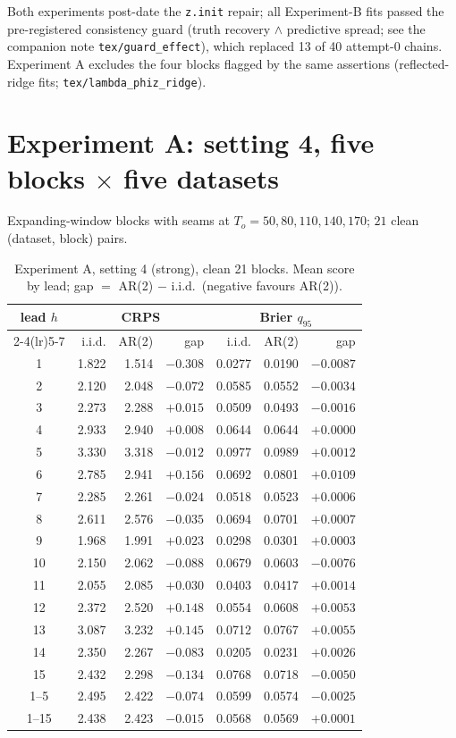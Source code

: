 \documentclass[11pt]{article}
\newcommand{\code}[1]{\texttt{#1}}
\begin{document}
Both experiments post-date the \code{z.init} repair; all
Experiment-B fits passed the pre-registered consistency guard (truth
recovery $\wedge$ predictive spread; see the companion note
\code{tex/guard\_effect}), which replaced 13 of 40 attempt-0 chains.
Experiment A excludes the four blocks flagged by the same assertions
(reflected-ridge fits; \code{tex/lambda\_phiz\_ridge}).

\section{Experiment A: setting 4, five blocks $\times$ five datasets}

Expanding-window blocks with seams at $T_o = 50, 80, 110, 140, 170$;
$21$ clean (dataset, block) pairs.

\begin{table}[ht]
\centering
\caption{Experiment A, setting 4 (strong), clean 21 blocks. Mean score by
lead; gap $=$ AR(2) $-$ i.i.d.\ (negative favours AR(2)).}
\label{tab:expA}
\small
\begin{tabular}{crrrrrr}
\toprule
lead $h$ & \multicolumn{3}{c}{CRPS} & \multicolumn{3}{c}{Brier $q_{95}$} \\
\cmidrule(lr){2-4}\cmidrule(lr){5-7}
 & i.i.d. & AR(2) & gap & i.i.d. & AR(2) & gap \\
\midrule
1 & 1.822 & 1.514 & $-0.308$ & 0.0277 & 0.0190 & $-0.0087$ \\
2 & 2.120 & 2.048 & $-0.072$ & 0.0585 & 0.0552 & $-0.0034$ \\
3 & 2.273 & 2.288 & $+0.015$ & 0.0509 & 0.0493 & $-0.0016$ \\
4 & 2.933 & 2.940 & $+0.008$ & 0.0644 & 0.0644 & $+0.0000$ \\
5 & 3.330 & 3.318 & $-0.012$ & 0.0977 & 0.0989 & $+0.0012$ \\
6 & 2.785 & 2.941 & $+0.156$ & 0.0692 & 0.0801 & $+0.0109$ \\
7 & 2.285 & 2.261 & $-0.024$ & 0.0518 & 0.0523 & $+0.0006$ \\
8 & 2.611 & 2.576 & $-0.035$ & 0.0694 & 0.0701 & $+0.0007$ \\
9 & 1.968 & 1.991 & $+0.023$ & 0.0298 & 0.0301 & $+0.0003$ \\
10 & 2.150 & 2.062 & $-0.088$ & 0.0679 & 0.0603 & $-0.0076$ \\
11 & 2.055 & 2.085 & $+0.030$ & 0.0403 & 0.0417 & $+0.0014$ \\
12 & 2.372 & 2.520 & $+0.148$ & 0.0554 & 0.0608 & $+0.0053$ \\
13 & 3.087 & 3.232 & $+0.145$ & 0.0712 & 0.0767 & $+0.0055$ \\
14 & 2.350 & 2.267 & $-0.083$ & 0.0205 & 0.0231 & $+0.0026$ \\
15 & 2.432 & 2.298 & $-0.134$ & 0.0768 & 0.0718 & $-0.0050$ \\
\midrule
1--5 & 2.495 & 2.422 & $-0.074$ & 0.0599 & 0.0574 & $-0.0025$ \\
1--15 & 2.438 & 2.423 & $-0.015$ & 0.0568 & 0.0569 & $+0.0001$ \\
\bottomrule
\end{tabular}
\end{table}
\end{document}
